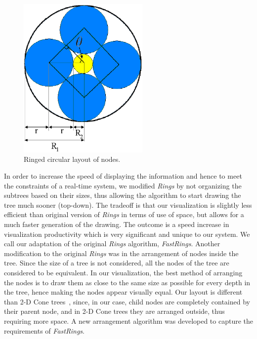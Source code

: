 \documentclass[]{article}
\begin{document}
{\begin{figure}[t]
\centering
\includegraphics[width=2.5in]{images/geoRings2}
\caption{Ringed circular layout of nodes.}
\label{fig_geoRings}
\end{figure}

In order to increase the speed of displaying the information and hence to meet the constraints of a real-time system, 
we modified {\em Rings} by not organizing the subtrees based on their sizes, thus allowing the algorithm to start drawing the tree much sooner (top-down).
The tradeoff is that our visualization is slightly less efficient than original version of {\em Rings} in terms of use of space, but allows for a much faster generation of the drawing.
The outcome is a speed increase in visualization productivity which is very significant and unique to our system.
We call our adaptation of the original {\em Rings} algorithm, {\em FastRings}.
Another modification to the original {\em Rings} was in the arrangement of nodes inside the tree.  
Since the size of a tree is not considered, all the nodes of the tree are considered to be equivalent.
In our visualization, the best method of arranging the nodes is to draw them as close to the same size as possible for every depth in the tree, hence making the nodes appear visually equal.
Our layout is different than 2-D Cone trees~\cite{rms91},  since, in our case, child nodes are completely contained by their parent node, and in 2-D Cone trees they are arranged outside, thus requiring more space.
A new arrangement algorithm was developed to capture the requirements of {\em FastRings}.

}
\end{document}
